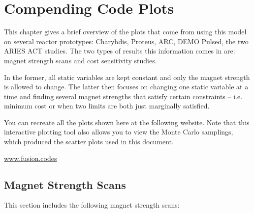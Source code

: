 %
%
%
%
%
%
%
%

\chapter{Compending Code Plots}

\label{chapter:extra}

This chapter gives a brief overview of the plots that come from using this model on several reactor prototypes: Charybdis, Proteus, ARC, DEMO Pulsed, the two ARIES ACT studies. The two types of results this information comes in are: magnet strength scans and cost sensitivity studies.

In the former, all static variables are kept constant and only the magnet strength is allowed to change. The latter then focuses on changing one static variable at a time and finding several magnet strengths that satisfy certain constraints -- i.e. minimum cost or when two limits are both just marginally satisfied.

You can recreate all the plots shown here at the following website. Note that this interactive plotting tool also allows you to view the Monte Carlo samplings, which produced the scatter plots used in this document.

{\centering \href{http://fusion.codes}{www.fusion.codes} \par }

\clearpage

\newpage

\section{Magnet Strength Scans}

This section includes the following magnet strength scans: ~

